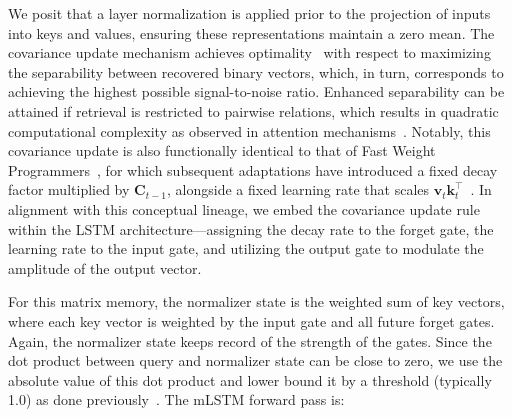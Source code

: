 We posit that a layer normalization is applied prior to the projection of inputs into keys and values, ensuring these representations maintain a zero mean. The covariance update mechanism achieves optimality~\citep{Dayan:91} with respect to maximizing the separability between recovered binary vectors, which, in turn, corresponds to achieving the highest possible signal-to-noise ratio. Enhanced separability can be attained if retrieval is restricted to pairwise relations, which results in quadratic computational complexity as observed in attention mechanisms~\citep{Krotov:16,Krotov:17,Ramsauer:21}. Notably, this covariance update is also functionally identical to that of Fast Weight Programmers~\citep{Schmidhuber:92ncfastweights,Schlag:21}, for which subsequent adaptations have introduced a fixed decay factor multiplied by $\mathbf{C}_{t-1}$, alongside a fixed learning rate that scales 
$\mathbf{v}_{t} \mathbf{k}_t ^\top$~\citep{Ba:16}. In alignment with this conceptual lineage, we embed the covariance update rule within the LSTM architecture—assigning the decay rate to the forget gate, the learning rate to the input gate, and utilizing the output gate to modulate the amplitude of the output vector.

For this matrix memory, the normalizer state is the weighted sum of key vectors, where each key vector is weighted by the input gate and all future forget gates. Again, the normalizer state keeps record of the strength of the gates. Since the dot product between query and normalizer state can be close to zero, we use the absolute value of this dot product and lower bound it by a threshold (typically 1.0) as done previously~\citep{Sun:23arxiv}. The mLSTM forward pass is:

